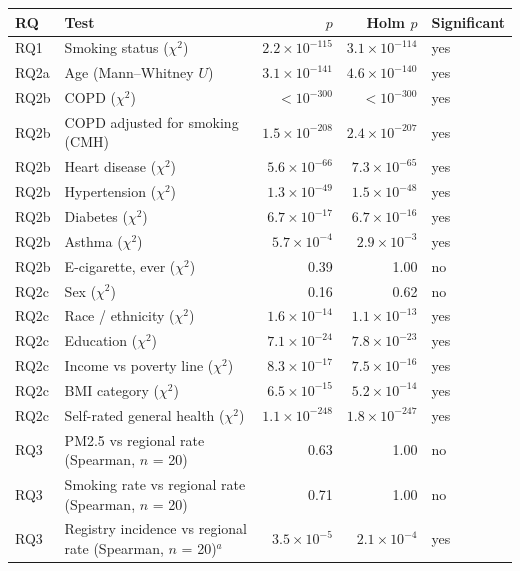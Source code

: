 \begin{tabularx}{\textwidth}{l >{\raggedright\arraybackslash}X r r l}
\toprule
RQ & Test & $p$ & Holm $p$ & Significant \\
\midrule
RQ1 & Smoking status ($\chi^2$) & $2.2\times10^{-115}$ & $3.1\times10^{-114}$ & yes \\
RQ2a & Age (Mann--Whitney $U$) & $3.1\times10^{-141}$ & $4.6\times10^{-140}$ & yes \\
RQ2b & COPD ($\chi^2$) & $<10^{-300}$ & $<10^{-300}$ & yes \\
RQ2b & COPD adjusted for smoking (CMH) & $1.5\times10^{-208}$ & $2.4\times10^{-207}$ & yes \\
RQ2b & Heart disease ($\chi^2$) & $5.6\times10^{-66}$ & $7.3\times10^{-65}$ & yes \\
RQ2b & Hypertension ($\chi^2$) & $1.3\times10^{-49}$ & $1.5\times10^{-48}$ & yes \\
RQ2b & Diabetes ($\chi^2$) & $6.7\times10^{-17}$ & $6.7\times10^{-16}$ & yes \\
RQ2b & Asthma ($\chi^2$) & $5.7\times10^{-4}$ & $2.9\times10^{-3}$ & yes \\
RQ2b & E-cigarette, ever ($\chi^2$) & 0.39 & 1.00 & no \\
RQ2c & Sex ($\chi^2$) & 0.16 & 0.62 & no \\
RQ2c & Race / ethnicity ($\chi^2$) & $1.6\times10^{-14}$ & $1.1\times10^{-13}$ & yes \\
RQ2c & Education ($\chi^2$) & $7.1\times10^{-24}$ & $7.8\times10^{-23}$ & yes \\
RQ2c & Income vs poverty line ($\chi^2$) & $8.3\times10^{-17}$ & $7.5\times10^{-16}$ & yes \\
RQ2c & BMI category ($\chi^2$) & $6.5\times10^{-15}$ & $5.2\times10^{-14}$ & yes \\
RQ2c & Self-rated general health ($\chi^2$) & $1.1\times10^{-248}$ & $1.8\times10^{-247}$ & yes \\
RQ3 & PM2.5 vs regional rate (Spearman, $n$ = 20) & 0.63 & 1.00 & no \\
RQ3 & Smoking rate vs regional rate (Spearman, $n$ = 20) & 0.71 & 1.00 & no \\
RQ3 & Registry incidence vs regional rate (Spearman, $n$ = 20)$^{a}$ & $3.5\times10^{-5}$ & $2.1\times10^{-4}$ & yes \\
\bottomrule
\end{tabularx}
